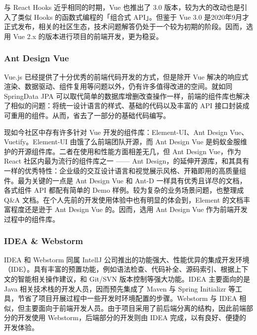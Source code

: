 与 React Hooks 近乎相同的时期，Vue 也推出了 3.0 版本，较为大的改动也是引入了类似 Hooks 的函数式编程的「组合式 API」。但鉴于 Vue 3.0 是2020年9月才正式发布，相关的社区生态，技术问题解答仍处于一个较为初期的阶段。因而，选用 Vue 2.x 的版本进行项目的前端开发，更为稳妥。

\subsubsection{Ant Design Vue}
Vue.js 已经提供了十分优秀的前端代码开发的方式，但是除开 Vue 解决的响应式渲染、数据驱动、组件复用等问题以外，仍有许多值得改进的空间。就如同 SpringData JPA 可以取代简单的数据库增删改查操作一样，前端的组件库也解决了相似的问题：将统一设计语言的样式、基础的代码以及丰富的 API 接口封装成可重用的组件。从而，省去了一部分的基础代码编写。

现如今社区中存有许多针对 Vue 开发的组件库：Element-UI、Ant Design Vue、Vuetify。Element-UI 由饿了么前端团队开源，而 Ant Design Vue 是蚂蚁金服维护的开源组件库。二者在使用和性能方面相差无几，但 Ant Design Vue，作为React 社区内最为流行的组件库之一 —— Ant Design，的延伸开源库，和其具有一样的优秀特性：企业级的交互设计语言和视觉展示风格、开箱即用的高质量组件。最为关键的一点是 Ant Design Vue 和 Ant-D 一样具有优秀且详尽的文档，各式组件 API 都配有简单的 Demo 样例。较为复杂的业务场景问题，也整理成 Q\&A 文档。在个人先前的开发使用体验中也有明显的体会到，Element 的文档丰富程度还是逊于 Ant Design Vue 的。因而，选用 Ant Design Vue 作为前端开发过程中的组件库。

\subsubsection{IDEA \& Webstorm}
IDEA 和 Webstorm 同属 IntellJ 公司推出的功能强大、性能优异的集成开发环境（IDE）。具有丰富的预置功能，例如语法检查、代码补全、源码索引、根据上下文的智能相关操作建议，和 Git/SVN 版本控制等强大功能。IDEA 主要面向的是 Java 相关技术栈的开发人员，因而预先集成了 Maven 与 Spring Initializr 等工具，节省了项目开展过程中一些开发时环境配置的步骤。Webstorm 与 IDEA 相似，但主要面向于前端开发人员。由于项目采用了前后端分离的结构，因此前端部分的开发使用 Webstorm，后端部分的开发则由 IDEA 完成，以有良好、便捷的开发体验。

